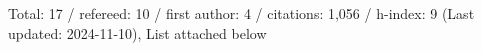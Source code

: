 Total: 17 / refereed: 10 / first author: 4 / citations: 1,056 / h-index: 9 (Last updated: 2024-11-10), List attached below